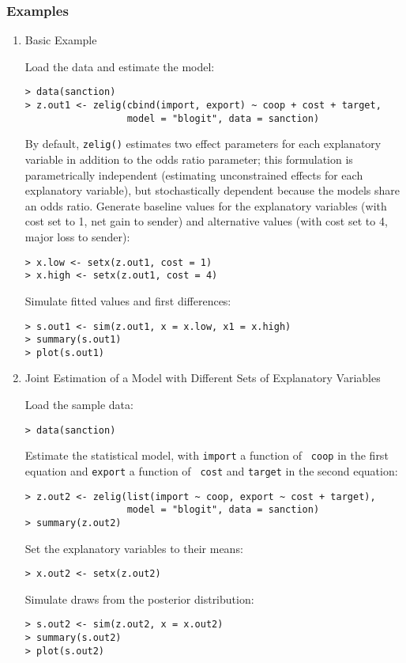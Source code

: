 \subsubsection{Examples}

\begin{enumerate}

\item {Basic Example} \label{basic.bl}

Load the data and estimate the model:  
\begin{verbatim}
> data(sanction)
> z.out1 <- zelig(cbind(import, export) ~ coop + cost + target, 
                  model = "blogit", data = sanction)
\end{verbatim}
By default, {\tt zelig()} estimates two effect parameters
for each explanatory variable in addition to the odds ratio parameter;
this formulation is parametrically independent (estimating
unconstrained effects for each explanatory variable), but
stochastically dependent because the models share an odds ratio.
\newline \newline Generate baseline values for the explanatory
variables (with cost set to 1, net gain to sender) and alternative
values (with cost set to 4, major loss to sender):
\begin{verbatim}
> x.low <- setx(z.out1, cost = 1)
> x.high <- setx(z.out1, cost = 4)
\end{verbatim}
Simulate fitted values and first differences:  
\begin{verbatim}
> s.out1 <- sim(z.out1, x = x.low, x1 = x.high)
> summary(s.out1)
> plot(s.out1)
\end{verbatim}

\item {Joint Estimation of a Model with Different Sets of Explanatory Variables}\label{sto.dep.logit}

Load the sample data:
\begin{verbatim}
> data(sanction)
\end{verbatim}
Estimate the statistical model, with {\tt import} a function of {\tt
  coop} in the first equation and {\tt export} a function of {\tt
  cost} and {\tt target} in the second equation:
\begin{verbatim}
> z.out2 <- zelig(list(import ~ coop, export ~ cost + target), 
                  model = "blogit", data = sanction)
> summary(z.out2)
\end{verbatim}
Set the explanatory variables to their means:
\begin{verbatim}
> x.out2 <- setx(z.out2)
\end{verbatim}
Simulate draws from the posterior distribution:
\begin{verbatim}
> s.out2 <- sim(z.out2, x = x.out2)
> summary(s.out2)
> plot(s.out2)
\end{verbatim}


\end{enumerate}
